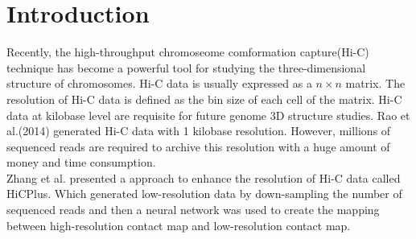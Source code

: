 \section{Introduction}
Recently, the high-throughput chromoseome comformation capture(Hi-C) technique has become a powerful tool for studying the three-dimensional structure of chromosomes. Hi-C data is usually expressed as a $n \times n$ matrix. The resolution of Hi-C data is defined as the bin size of each cell of the matrix. Hi-C data at kilobase level are requisite for future genome 3D structure studies. Rao et al.(2014) generated Hi-C data with 1 kilobase resolution. However, millions of sequenced reads are required to archive this resolution with a huge amount of money and time consumption.\\
Zhang et al. presented a approach to enhance the resolution of Hi-C data called HiCPlus. Which generated low-resolution data by down-sampling the number of sequenced reads and then a neural network was used to create the mapping between high-resolution contact map and low-resolution contact map. 

\cite{Mizushima2011Autophagy}